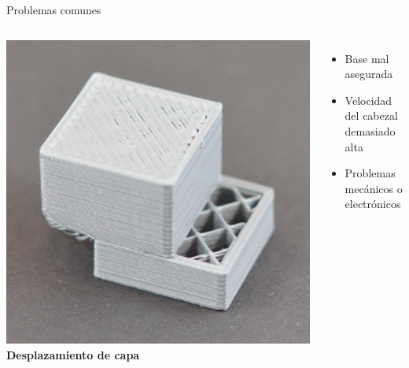 \documentclass{beamer}
\begin{document}
	\begin{frame}{Problemas comunes}
		\begin{columns}
				\includegraphics[width=\textwidth]{images/Layer-Shifting}
				\textbf{Desplazamiento de capa}
				\begin{itemize}
					\item Base mal asegurada
					\item Velocidad del cabezal demasiado alta
					\item Problemas mecánicos o electrónicos
				\end{itemize}
		\end{columns}
	\end{frame}
\end{document}
